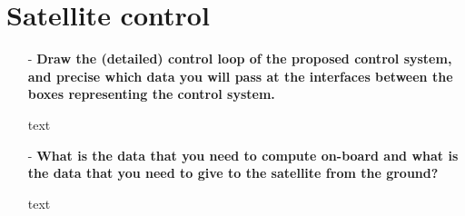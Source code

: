 \section{Satellite control}

\begin{itemize}
    \item[-] \textbf{Draw the (detailed) control loop of the proposed control system, and precise which data you will pass at the interfaces between the boxes representing the control system. }

    text
    
    \item[-] \textbf{What is the data that you need to compute on-board and what is the data that you need to give to the satellite from the ground? }

    text
    
\end{itemize}